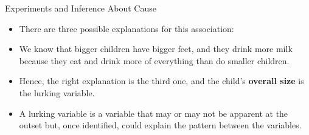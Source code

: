 \documentclass[handout]{beamer}
\begin{document}
\begin{frame}{Experiments and Inference About Cause}
\scriptsize{

\begin{itemize}
\item There are three possible explanations for this association:
\item We know that bigger children have bigger feet, and they drink more milk because they eat and drink more of everything than do smaller children.

\item Hence, the right explanation is the third one, and the child's \textbf{overall size} is the lurking variable.

 \item A lurking variable is a variable that may or may not be apparent at the outset but, once identified, could explain the pattern between the variables.

\end{itemize}



} 
\end{frame}
\end{document}
